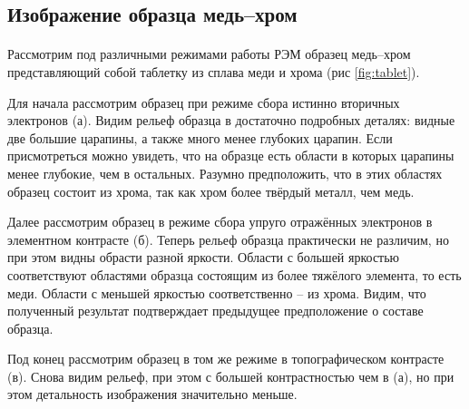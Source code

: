 \documentclass[a4paper,12pt]{article} %
\begin{document}
\subsection{Изображение образца медь--хром}
\label{sus}

\paragraph{} Рассмотрим под различными режимами работы РЭМ образец медь--хром представляющий собой таблетку из сплава меди и хрома (рис \ref{fig:tablet}). 

Для начала рассмотрим образец при режиме сбора истинно вторичных электронов (а). Видим рельеф образца в достаточно подробных деталях: видные две большие царапины, а также много менее глубоких царапин. Если присмотреться можно увидеть, что на образце есть области в которых царапины менее глубокие, чем в остальных. Разумно предположить, что в этих областях образец состоит из хрома, так как хром более твёрдый металл, чем медь. 

Далее рассмотрим образец в режиме сбора упруго отражённых электронов в элементном контрасте (б). Теперь рельеф образца практически не различим, но при этом видны обрасти разной яркости. Области с большей яркостью соответствуют областями образца состоящим из более тяжёлого элемента, то есть меди. Области с меньшей яркостью соответственно -- из хрома. Видим, что полученный результат подтверждает предыдущее предположение о составе образца.

Под конец рассмотрим образец в том же режиме в топографическом контрасте (в). Снова видим рельеф, при этом с большей контрастностью чем в (а), но при этом детальность изображения значительно меньше.
\end{document}
